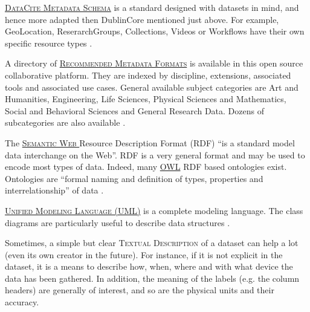 \vspace{0.4cm}

\noindent {} \textsc{\href{https://schema.datacite.org/}{DataCite Metadata Schema}} is a standard designed with datasets in mind, and hence more adapted then DublinCore mentioned just above. For example, GeoLocation, ReserarchGroups, Collections, Videos or Workflows have their own specific resource types \cite{datacite_datacite_2015}.

\vspace{0.4cm}

\noindent A directory of   \textsc{\href{http://rd-alliance.github.io/metadata-directory/}{Recommended Metadata Formats}} is available in this open source collaborative platform. They are indexed by discipline, extensions, associated tools and associated use cases. General available subject categories are Art and Humanities, Engineering, Life Sciences, Physical Sciences and Mathematics, Social and Behavioral Sciences and General Research Data. Dozens of subcategories are also available \cite{metadatadirectory_metadata_2015}.

\vspace{0.4cm}

\noindent The  \textsc{\href{http://www.w3.org/RDF/}{Semantic Web }} Resource Description Format (RDF) ``is a standard model data interchange on the Web''\cite{w3c_rdf_2014}. RDF is a very general format and may be used to encode most types of data. Indeed, many \href{http://www.w3.org/2001/sw/wiki/OWL}{OWL} \cite{w3c_owl_2009} RDF based ontologies exist. Ontologies are ``formal naming and definition of types, properties and interrelationship'' of data \cite{wikipedia_ontology_2015}.

\vspace{0.4cm}

 \textsc{\href{http://www.uml.org/}{Unified Modeling Language (UML)}} is a complete modeling language. The class diagrams are particularly useful to describe data structures \cite{uml.org_unified_2015}.

\vspace{0.4cm}

\noindent Sometimes, a simple but clear  \textsc{Textual Description} of a dataset can help a lot (even its own creator in the future). For instance, if it is not explicit in the dataset, it is a means to describe how, when, where and with what device the data has been gathered. In addition, the meaning of the labels (e.g. the column headers) are generally of interest, and so are the physical units and their accuracy.

